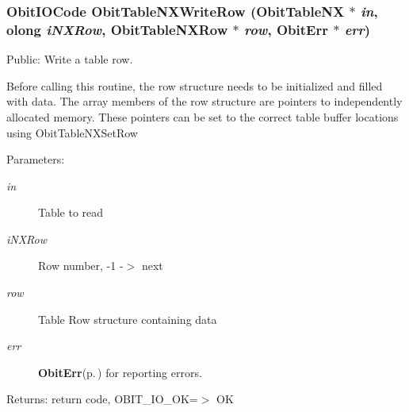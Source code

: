 \subsubsection{\setlength{\rightskip}{0pt plus 5cm}Obit\-IOCode Obit\-Table\-NXWrite\-Row ({\bf Obit\-Table\-NX} $\ast$ {\em in}, {\bf olong} {\em i\-NXRow}, {\bf Obit\-Table\-NXRow} $\ast$ {\em row}, {\bf Obit\-Err} $\ast$ {\em err})}\label{ObitTableNX_8c_a24}


Public: Write a table row. 

Before calling this routine, the row structure needs to be initialized and filled with data. The array members of the row structure are pointers to independently allocated memory. These pointers can be set to the correct table buffer locations using Obit\-Table\-NXSet\-Row \begin{Desc}
\item[Parameters:]
\begin{description}
\item[{\em in}]Table to read \item[{\em i\-NXRow}]Row number, -1 -$>$ next \item[{\em row}]Table Row structure containing data \item[{\em err}]{\bf Obit\-Err}{\rm (p.\,\pageref{structObitErr})} for reporting errors. \end{description}
\end{Desc}
\begin{Desc}
\item[Returns:]return code, OBIT\_\-IO\_\-OK=$>$ OK \end{Desc}

